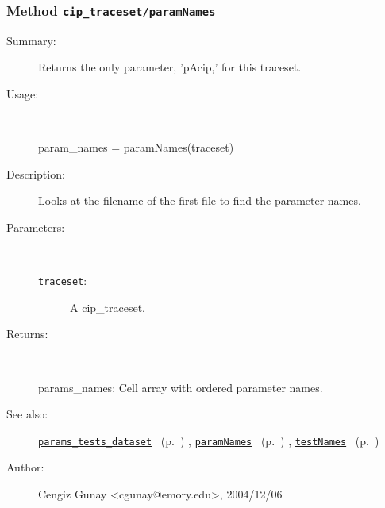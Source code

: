 \subsubsection[Method \texttt{paramNames}]{Method \texttt{cip\_traceset/paramNames}}%
%
\label{ref_cip_traceset__paramNames}%
\hypertarget{ref_cip_traceset__paramNames}{}%
\begin{description}
\item[Summary:]Returns the only parameter, 'pAcip,' for this traceset.
%
\item[Usage:]~%
\begin{lyxcode}%
param\_names = paramNames(traceset)
%
\end{lyxcode}%
%
\item[Description:]%
Looks at the filename of the first file to find the parameter names.
\item[Parameters:]~
\begin{description}%
\item[\texttt{traceset}:]
 A cip\_traceset.
\end{description}%
%
\item[Returns:]~

	params\_names: Cell array with ordered parameter names.
%
%
\item[See also:]%
\hyperlink{ref_params_tests_dataset}{\texttt{params\_tests\_dataset}}%
\ (p.~\pageref{ref_params_tests_dataset})%
%
, \hyperlink{ref_paramNames}{\texttt{paramNames}}%
\ (p.~\pageref{ref_paramNames})%
%
, \hyperlink{ref_testNames}{\texttt{testNames}}%
\ (p.~\pageref{ref_testNames})%
%
%
\item[Author:]%
Cengiz Gunay <cgunay@emory.edu>, 2004/12/06%
\end{description}
\methodline%
